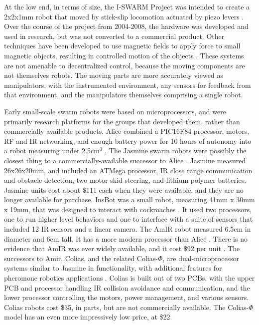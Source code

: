 At the low end, in terms of size, the I-SWARM Project was intended to create a 2x2x1mm robot that moved by stick-slip locomotion actuated by piezo levers \citep{seyfried2005swarm}. 
Over the course of the project from 2004-2008, the hardware was developed and used in research, but was not converted to a commercial product.
Other techniques have been developed to use magnetic fields to apply force to small magnetic objects, resulting in controlled motion of the objects \citep{floyd2008untethered, pelrine2012diamagnetically}.
These systems are not amenable to decentralized control, because the moving components are not themselves robots. 
The moving parts are more accurately viewed as manipulators, with the instrumented environment, any sensors for feedback from that environment, and the manipulators themselves comprising a single robot. 

Early small-scale swarm robots were based on microprocessors, and were primarily research platforms for the groups that developed them, rather than commercially available products.
Alice combined a PIC16F84 processor, motors, RF and IR networking, and enough battery power for 10 hours of autonomy into a robot measuring under 2.5cm$^3$ \citep{caprari1998autonomous}. 
The Jasmine swarm robots were possibly the closest thing to a commercially-available successor to Alice \citep{kernbach2011swarmrobot}.
Jasmine measured 26x26x20mm, and included an ATMega processor, IR close range communication and obstacle detection, two motor skid steering, and lithium-polymer batteries.
Jasmine units cost about \$111 each when they were available, and they are no longer available for purchase. 
InsBot was a small robot, measuring 41mm x 30mm x 19mm, that was designed to interact with cockroaches \citep{colot2004insbot}.
It used two processors, one to run higher level behaviors and one to interface with a suite of sensors that included 12 IR sensors and a linear camera. 
The AmIR robot measured 6.5cm in diameter and 6cm tall. It has a more modern processor than Alice \citep{arvin2009development}.
There is no evidence that AmIR was ever widely available, and it cost \$92 per unit \citep{arvin2015colias}.
The successors to Amir, Colias, and the related Colias-$\Phi$, are dual-microprocessor systems similar to Jasmine in functionality, with additional features for pheromone robotics applications \citep{arvin2014colias, arvin2015colias}. 
Colias is built out of two PCBs, with the upper PCB and processor handling IR collision avoidance and communication, and the lower processor controlling the motors, power management, and various sensors.
Colias robots cost \$35, in parts, but are not commercially available. 
The Colias-$\Phi$ model has an even more impressively low price, at \$22.

